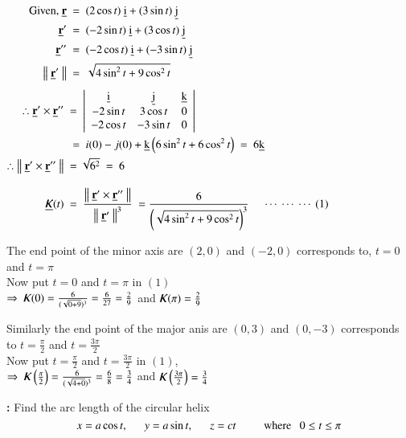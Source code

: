\documentclass[12pt]{article}
\renewcommand{\vec}[1]{\underline{\mathrm{#1}}}
\renewcommand{\r}{\mathrm{\textbf{r}}}
\let\oldkappa\kappa
\renewcommand{\kappa}{\scalebox{1.25}{$\oldkappa$}}
\newcommand{\vf}[2][t]{\vec{#2}(#1)}
\newcommand{\norm}[1]{\left\lVert\ #1\ \right\rVert}
\begin{document}
\vspace{2ex}
\vspace{1ex}
$\begin{aligned}
\text{Given,}\ \vec{\r} & \ = \ \vecxy[(2\cos{t})][(3\sin{t})]\\
\vdt{\r} & \ = \ \vecxy[(-2\sin{t})][(3\cos{t})] \\
\vdtt{\r} & \ = \ \vecxy[(-2\cos{t})][(-3\sin{t})] \\
\norm{\vdt{\r}} & \ = \ \sqrt{4\sin^2{t}+9\cos^2{t}}\\[1ex]
\therefore \vdt{\r} \times \vdtt{\r} \ & = \
\left|\begin{array}{ccc}
   \vec{i} & \vec{j} & \vec{k} \\
   -2\sin{t} & 3\cos{t} & 0 \\
   -2\cos{t} & -3\sin{t} & 0
   \end{array}\right|\\
   & \ = \ i(0) - j(0) + \vec{k}\left(6\sin^2{t} + 6\cos^2{t}\right) \ = \ 6\vec{k}\\
   \therefore \norm{\vdt{\r} \times \vdtt{\r}} \ & = \sqrt{6^2} \ = \ 6\\[2ex]
   \vf{\kappa} \ &= \ \frac{\norm{\vdt{\r} \times \vdtt{\r}}}{\norm{\vdt{\r}}^3} \ =\frac{6}{\left(\sqrt{4\sin^2{t}+9\cos^2{t}}\right)^3} \quad \seteqno{1}\\
\end{aligned}$

\vspace{4ex}
The end point of the minor axis are $(2,0)$ and $(-2,0)$ corresponds to, $t=0$ and $t=\pi$\\
Now put $t=0$ and $t=\pi$ in $(1)$\\[1ex]
$\Rightarrow \ \kappa(0)=\frac{6}{(\sqrt{0+9})^3}=\frac{6}{27}=\frac{2}{9}$ \tabs and \tabs $\kappa(\pi)=\frac{2}{9}$

\vspace{4ex}
Similarly the end point of the major anis are $(0,3)$ and $(0,-3)$ corresponds to $t=\frac{\pi}{2}$ and $t=\frac{3\pi}{2}$\\
Now put $t=\frac{\pi}{2}$ and $t = \frac{3\pi}{2}$ in $(1)$,\\[1ex]
$\Rightarrow \ \kappa\left(\frac{\pi}{2}\right)=\frac{6}{(\sqrt{4+0})^3}=\frac{6}{8}=\frac{3}{4}$  \tabs and \tabs $\kappa\left(\frac{3 \pi}{2}\right)=\frac{3}{4}$


\pagebreak
\textbf{:} Find the arc length of the circular helix
\vspace{-\baselineskip}
$$x=a\cos{t}, \ \ \ \ \ \  y=a\sin{t}, \ \ \ \ \ \  z=ct \ \ \ \ \ \  \quad \text{where} \ \ \  0 \leq t \leq \pi$$
\end{document}

